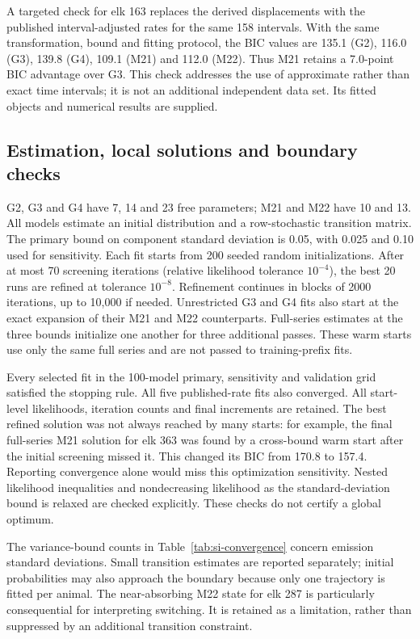 \documentclass[11pt]{article}
\begin{document}
A targeted check for elk 163 replaces the derived displacements with the
published interval-adjusted rates for the same 158 intervals. With the same
transformation, bound and fitting protocol, the BIC values are 135.1 (G2),
116.0 (G3), 139.8 (G4), 109.1 (M21) and 112.0 (M22). Thus M21 retains a
7.0-point BIC advantage over G3. This check addresses the use of approximate
rather than exact time intervals; it is not an additional independent data
set. Its fitted objects and numerical results are supplied.

\subsection{Estimation, local solutions and boundary checks}

G2, G3 and G4 have 7, 14 and 23 free parameters; M21 and M22 have 10 and 13.
All models estimate an initial distribution and a row-stochastic transition
matrix. The primary bound on component standard deviation is 0.05, with
0.025 and 0.10 used for sensitivity. Each fit starts from 200 seeded random
initializations. After at most 70 screening iterations (relative likelihood
tolerance $10^{-4}$), the best 20 runs are refined at tolerance $10^{-8}$.
Refinement continues in blocks of 2000 iterations, up to 10,000 if needed.
Unrestricted G3 and G4 fits also start at the exact expansion of their M21
and M22 counterparts. Full-series estimates at the three bounds initialize
one another for three additional passes. These warm starts use only the same
full series and are not passed to training-prefix fits.

Every selected fit in the 100-model primary, sensitivity and validation grid
satisfied the stopping rule. All five published-rate fits also converged.
All start-level likelihoods, iteration counts and final increments are
retained. The best refined solution was not always reached by many starts:
for example, the final full-series M21 solution for elk 363 was found by a
cross-bound warm start after the initial screening missed it. This changed
its BIC from 170.8 to 157.4. Reporting convergence alone would miss this
optimization sensitivity. Nested likelihood inequalities and nondecreasing
likelihood as the standard-deviation bound is relaxed are checked explicitly.
These checks do not certify a global optimum.



The variance-bound counts in Table~\ref{tab:si-convergence} concern emission
standard deviations. Small transition estimates are reported separately;
initial probabilities may also approach the boundary because only one
trajectory is fitted per animal. The near-absorbing M22 state for elk 287 is
particularly consequential for interpreting switching. It is retained as a
limitation, rather than suppressed by an additional transition constraint.
\end{document}
